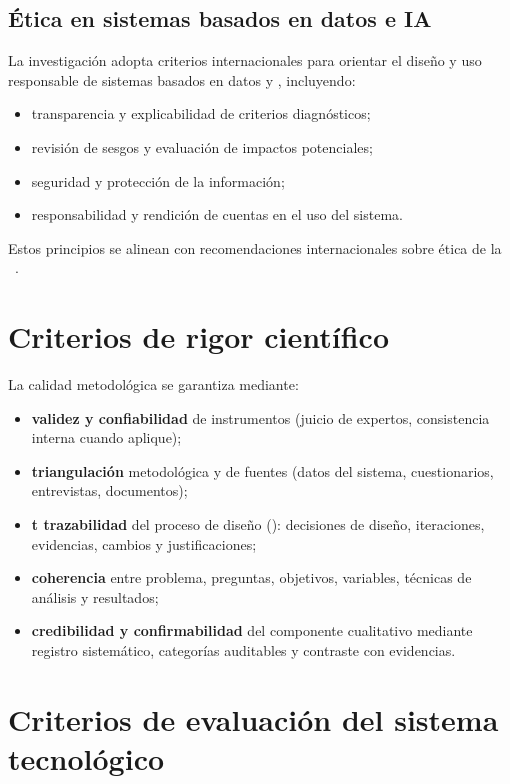 \begin{refsection}
\subsection{Ética en sistemas basados en datos e IA}

La investigación adopta criterios internacionales para orientar el diseño y uso responsable de sistemas basados en datos y \IA, incluyendo:

\begin{itemize}
\item transparencia y explicabilidad de criterios diagnósticos;
\item revisión de sesgos y evaluación de impactos potenciales;
\item seguridad y protección de la información;
\item responsabilidad y rendición de cuentas en el uso del sistema.
\end{itemize}

Estos principios se alinean con recomendaciones internacionales sobre ética de la \IA\ \parencite{unesco2021}.

\section{Criterios de rigor científico}

La calidad metodológica se garantiza mediante:

\begin{itemize}
\item \textbf{validez y confiabilidad} de instrumentos (juicio de expertos, consistencia interna cuando aplique);
\item \textbf{triangulación} metodológica y de fuentes (datos del sistema, cuestionarios, entrevistas, documentos);
\item \textbf{t trazabilidad} del proceso de diseño (\DBR): decisiones de diseño, iteraciones, evidencias, cambios y justificaciones;
\item \textbf{coherencia} entre problema, preguntas, objetivos, variables, técnicas de análisis y resultados;
\item \textbf{credibilidad y confirmabilidad} del componente cualitativo mediante registro sistemático, categorías auditables y contraste con evidencias.
\end{itemize}
\section{Criterios de evaluación del sistema tecnológico}


\end{refsection}
